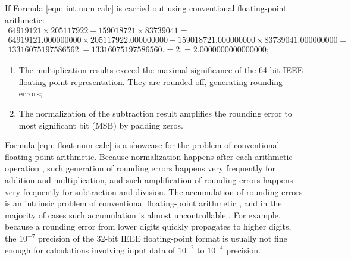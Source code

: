 \documentclass[twoside]{article}
\numberwithin{equation}{section}
\begin{document}
If Formula \eqref{eqn: int num calc} is carried out using conventional floating-point arithmetic: 
\begin{multline}
\label{eqn: float num calc}
64919121 \times 205117922 - 159018721 \times 83739041 =\\ 
64919121.000000000 \times 205117922.000000000 - 159018721.000000000 \times 83739041.000000000 =\\
13316075197586562. - 13316075197586560. = 2. = 2.0000000000000000;
\end{multline}
\begin{enumerate}
\item  The multiplication results exceed the maximal significance of the 64-bit IEEE floating-point representation. They are rounded off, generating rounding errors;
\item  The normalization of the subtraction result amplifies the rounding error to most significant bit (MSB) by padding zeros.
\end{enumerate}

\noindent Formula \eqref{eqn: float num calc} is a showcase for the problem of conventional floating-point arithmetic.  
Because normalization happens after each arithmetic operation \cite{Computer_Architecture}\cite{Floating_Point_Arithmetic}\cite{Floating_Point_Standard}, such generation of rounding errors happens very frequently for addition and multiplication, and such amplification of rounding errors happens very frequently for subtraction and division.  
The accumulation of rounding errors is an intrinsic problem of conventional floating-point arithmetic \cite{Numerical_Recipes}, and in the majority of cases such accumulation is almost uncontrollable \cite{Arithmetic_Digital_Computers}.  
For example, because a rounding error from lower digits quickly propagates to higher digits, the $10^{-7}$ precision of the 32-bit IEEE floating-point format \cite{Computer_Architecture}\cite{Floating_Point_Arithmetic}\cite{Floating_Point_Standard} is usually not fine enough for calculations involving input data of $10^{-2}$ to $10^{-4}$ precision.
\end{document}
